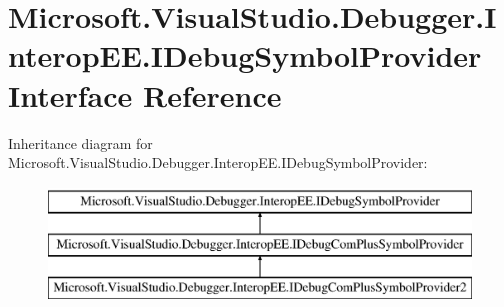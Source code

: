 \hypertarget{interface_microsoft_1_1_visual_studio_1_1_debugger_1_1_interop_e_e_1_1_i_debug_symbol_provider}{\section{Microsoft.\+Visual\+Studio.\+Debugger.\+Interop\+E\+E.\+I\+Debug\+Symbol\+Provider Interface Reference}
\label{interface_microsoft_1_1_visual_studio_1_1_debugger_1_1_interop_e_e_1_1_i_debug_symbol_provider}
}
Inheritance diagram for Microsoft.\+Visual\+Studio.\+Debugger.\+Interop\+E\+E.\+I\+Debug\+Symbol\+Provider\+:\begin{figure}[H]
\begin{center}
\leavevmode
\includegraphics[height=3.000000cm]{interface_microsoft_1_1_visual_studio_1_1_debugger_1_1_interop_e_e_1_1_i_debug_symbol_provider}
\end{center}
\end{figure}

